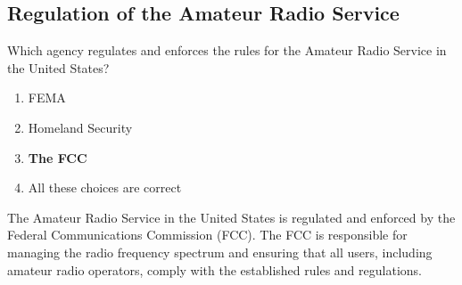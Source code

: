 \subsection{Regulation of the Amateur Radio Service}
\label{T1A02}

\begin{tcolorbox}[colback=gray!10!white,colframe=black!75!black,title=T1A02]
Which agency regulates and enforces the rules for the Amateur Radio Service in the United States?
\begin{enumerate}[label=\Alph*,noitemsep]
    \item FEMA
    \item Homeland Security
    \item \textbf{The FCC}
    \item All these choices are correct
\end{enumerate}
\end{tcolorbox}

The Amateur Radio Service in the United States is regulated and enforced by the Federal Communications Commission (FCC). The FCC is responsible for managing the radio frequency spectrum and ensuring that all users, including amateur radio operators, comply with the established rules and regulations.